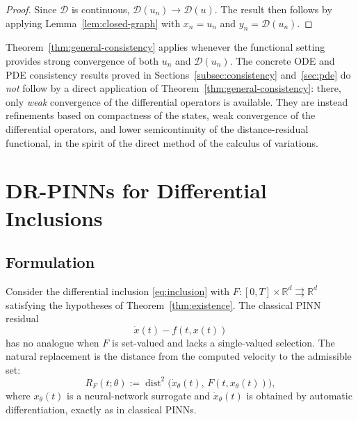\documentclass[11pt]{elsarticle}
\theoremstyle{definition}
\theoremstyle{remark}
\numberwithin{equation}{section}
\def\dist{\operatorname{dist}}
\begin{document}
	\begin{proof}
		Since $\mathcal{D}$ is continuous, $\mathcal{D}(u_n)\to\mathcal{D}(u)$. The result then follows by applying Lemma~\ref{lem:closed-graph} with $x_n=u_n$ and $y_n=\mathcal{D}(u_n)$.
	\end{proof}
	
	Theorem~\ref{thm:general-consistency} applies whenever the functional
	setting provides strong convergence of both $u_n$ and
	$\mathcal{D}(u_n)$.  The concrete ODE and PDE consistency results proved in
	Sections~\ref{subsec:consistency} and~\ref{sec:pde} do \emph{not} follow
	by a direct application of Theorem~\ref{thm:general-consistency}: there,
	only \emph{weak} convergence of the differential operators is available.
	They are instead refinements based on compactness of the states, weak
	convergence of the differential operators, and lower semicontinuity of the
	distance-residual functional, in the spirit of the direct method of the
	calculus of variations.
	
	
	\section{DR-PINNs for Differential Inclusions}
	\label{sec:distance-residual}
	
	\subsection{Formulation}
	\label{sec:description-formulation}
	
	Consider the differential inclusion \eqref{eq:inclusion} with $F:[0,T]\times\mathbb{R}^d\rightrightarrows\mathbb{R}^d$ satisfying
	the hypotheses of Theorem~\ref{thm:existence}.  The classical PINN
	residual
	\[
	\dot{x}(t)-f(t,x(t))
	\]
	has no analogue when $F$ is set-valued and lacks a single-valued
	selection.  The natural replacement is the distance from the computed
	velocity to the admissible set:
	\begin{equation}\label{eq:inclusion-residual}
		R_F(t;\theta)
		:=
		\dist^2\bigl(\dot{x}_\theta(t),\,F(t,x_\theta(t))\bigr),
	\end{equation}
	where $x_\theta(t)$ is a neural-network surrogate and $\dot{x}_\theta(t)$
	is obtained by automatic differentiation, exactly as in classical PINNs.
	
\end{document}
